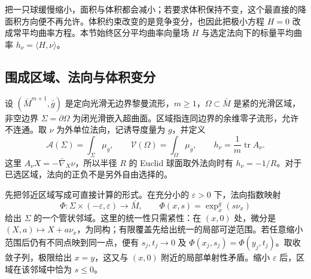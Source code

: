 
% 
% 
% 
% 


把一只球缓慢缩小，面积与体积都会减小；若要求体积保持不变，这个最直接的降面积方向便不再允许。体积约束改变的是竞争变分，也因此把极小方程 \(H=0\) 改成常平均曲率方程。本节始终区分平均曲率向量场 \(H\) 与选定法向下的标量平均曲率 \(h_\nu=\langle H,\nu\rangle\)。

\subsection{围成区域、法向与体积变分}
\label{g3:subsec:1905:01}
设 \((\bar M^{m+1},\bar g)\) 是定向光滑无边界黎曼流形，\(m\ge1\)，\(\Omega\subset\bar M\) 是紧的光滑区域，非空边界 \(\Sigma=\partial\Omega\) 为闭光滑嵌入超曲面。区域指连同边界的余维零子流形，允许不连通。取 \(\nu\) 为外单位法向，记诱导度量为 \(g\)，并定义
\[
	\mathcal A(\Sigma)=\int_\Sigma\mu_g,
	\qquad \mathcal V(\Omega)=\int_\Omega\mu_{\bar g},
	\qquad h_\nu=\frac1m\operatorname{tr}A_\nu.
\]
这里 \(A_\nu X=-\bar\nabla_X\nu\)，所以半径 \(R\) 的 Euclid 球面取外法向时有 \(h_\nu=-1/R\)。对于已选区域，法向的正负不是另外自由选择的。

\ProseParagraphBreak

先把邻近区域写成可直接计算的形式。在充分小的 \(\varepsilon>0\) 下，法向指数映射
\[
	\Phi:\Sigma\times(-\varepsilon,\varepsilon)\longrightarrow\bar M,
	\qquad \Phi(x,s)=\exp_x^{\bar g}(s\nu_x)
\]
给出 \(\Sigma\) 的一个管状邻域。这里的统一性只需紧性：在 \((x,0)\) 处，微分是 \((X,a)\mapsto X+a\nu_x\)，为同构；有限覆盖先给出统一的局部可逆范围。若任意缩小范围后仍有不同点映到同一点，便有 \(s_j,t_j\to0\) 及 \(\Phi(x_j,s_j)=\Phi(y_j,t_j)\)。取收敛子列，极限给出 \(x=y\)，这又与 \((x,0)\) 附近的局部单射性矛盾。缩小 \(\varepsilon\) 后，区域在该邻域中恰为 \(s\le0\)。

